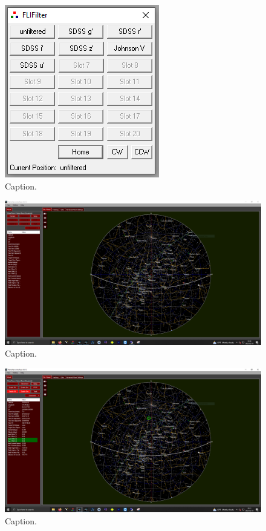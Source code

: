 \documentclass{article}
\begin{document}
	\begin{figure}[htbp!]
		\centering
		\includegraphics[scale=1]{images/flifilter-2.png}
		\caption{Caption.}
		\label{fig:flifilter-2}
	\end{figure}
	
	\begin{figure}[htbp!]
		\centering
		\includegraphics[scale=0.25]{images/pwi4-1.png}
		\caption{Caption.}
		\label{fig:pwi4-1}
	\end{figure}
	
	\begin{figure}[htbp!]
		\centering
		\includegraphics[scale=0.25]{images/pwi4-2.png}
		\caption{Caption.}
		\label{fig:pwi4-2}
	\end{figure}
	
\end{document}
